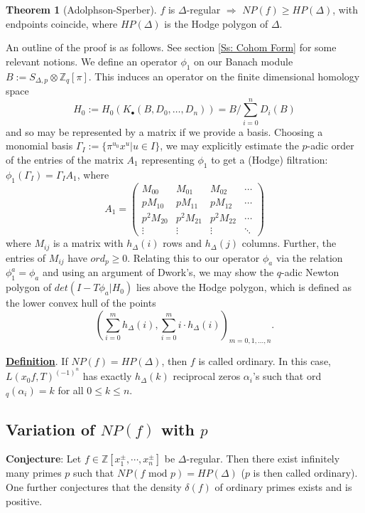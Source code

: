 \documentclass[a4paper,oneside,11pt]{article}
\theoremstyle{plain} \theoremstyle{definition}
\newtheorem{Thm}{Theorem}[section]
\theoremstyle{remark}
\def\bb #1{ {\mathbb #1} }
\newcommand{\Z}{\mathbb{Z}}
\newcommand{\Mod}{\text{ mod }}
\def\sd { S_{\Delta, p} }
\begin{document}
\begin{Thm}[Adolphson-Sperber]
$f$ is $\Delta$-regular $\Rightarrow$ $NP(f)\ge HP(\Delta)$, with
endpoints coincide, where $HP(\Delta)$ is the Hodge polygon of
$\Delta$.
\end{Thm}

An outline of the proof is as follows. See section \ref{Ss: Cohom
Form} for some relevant notions. We define an operator $\phi_1$ on
our Banach module $B := \sd \otimes \bb Z_q[\pi]$. This induces an
operator on the finite dimensional homology space 
$$H_0 := H_0(K_\bullet(B, D_0, \ldots, D_n)) = B/\sum_{i=0}^n D_i(B)$$ 
and so may be represented by a
matrix if we provide a basis. Choosing a monomial basis $\Gamma_I
:= \{ \pi^{u_0} x^u | u \in I \}$, we may explicitly estimate the
$p$-adic order of the entries of the matrix $A_1$ representing
$\phi_1$ to get a (Hodge) filtration: $\phi_1(\Gamma_I) = \Gamma_I A_1$, where 
\[
A_1 = \left(\begin{array}{rrrr}
M_{00} &  M_{01} & M_{02} & \cdots \\
pM_{10} & pM_{11} & pM_{12} & \cdots \\
p^2M_{20} & p^2 M_{21} & p^2 M_{22} & \cdots \\
\vdots & \vdots & \vdots & \ddots
\end{array}
\right)
\]
where $M_{ij}$ is a matrix with $h_\Delta(i)$ rows and
$h_\Delta(j)$ columns. Further, the entries of $M_{ij}$ have
$ord_p \geq 0$. Relating this to our operator $\phi_a$ via the
relation $\phi_1^a = \phi_a$ and using an argument of Dwork's, we
may show the $q$-adic Newton polygon of $det(I - T \phi_a | H_0)$
lies above the Hodge polygon, which is defined as the lower convex
hull of the points
\[
\left( \sum_{i=0}^m h_\Delta(i), \sum_{i=0}^m i \cdot h_\Delta(i)
\right)_{m=0, 1, \ldots, n}.
\]

\underline{\bf Definition}. If $NP(f)=HP(\Delta)$, then $f$ is called ordinary.
In this case, $L(x_0f, T)^{(-1)^n}$ has exactly $h_{\Delta}(k)$ reciprocal zeros
$\alpha_i$'s such that ord$_q(\alpha_i)=k$ for all $0\leq k\leq n$.

\subsection{Variation of $NP(f)$ with $p$}

{\bf Conjecture}: Let $f\in\Z[x_1^{\pm},\cdots,x_n^{\pm}]$
be $\Delta$-regular. Then there exist infinitely many primes $p$
such that $NP(f \Mod p )=HP(\Delta)$ ($p$ is then called ordinary).
One further conjectures that the density $\delta(f)$ of ordinary primes
exists and is positive.
\end{document}
